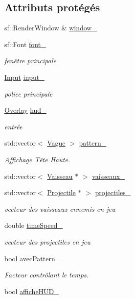 \subsection*{Attributs protégés}
\begin{DoxyCompactItemize}
\item 
sf\+::\+Render\+Window \& \hyperlink{class_partie_acb65cc46c340d6268679143aac50f8c0}{window\+\_\+}
\item 
sf\+::\+Font \hyperlink{class_partie_ab00aee0dc5c4a9eb16d17160bd6a707a}{font\+\_\+}
\begin{DoxyCompactList}\small\item\em fenêtre principale \end{DoxyCompactList}\item 
\hyperlink{_input_8h_a5588d60d674991c719a8df848313e966}{Input} \hyperlink{class_partie_a3a6f85686da661a2391dec412354c846}{input\+\_\+}
\begin{DoxyCompactList}\small\item\em police principale \end{DoxyCompactList}\item 
\hyperlink{class_overlay}{Overlay} \hyperlink{class_partie_a7d7dcc006ac52993ac65de1eae66bbf8}{hud\+\_\+}
\begin{DoxyCompactList}\small\item\em entrée \end{DoxyCompactList}\item 
std\+::vector$<$ \hyperlink{class_vague}{Vague} $>$ \hyperlink{class_partie_ab03632c60e33c4811178d9ce9c9454a9}{pattern\+\_\+}
\begin{DoxyCompactList}\small\item\em Affichage Tête Haute. \end{DoxyCompactList}\item 
std\+::vector$<$ \hyperlink{class_vaisseau}{Vaisseau} $\ast$ $>$ \hyperlink{class_partie_a39a4031c59acafbefca6fae1333ebb5a}{vaisseaux\+\_\+}
\item 
std\+::vector$<$ \hyperlink{class_projectile}{Projectile} $\ast$ $>$ \hyperlink{class_partie_a2e494ef1d28f7d1067c3a7a3282ecd29}{projectiles\+\_\+}
\begin{DoxyCompactList}\small\item\em vecteur des vaisseaux ennemis en jeu \end{DoxyCompactList}\item 
double \hyperlink{class_partie_abd0c9a82f1b42b06f4a3699a484e0766}{time\+Speed\+\_\+}
\begin{DoxyCompactList}\small\item\em vecteur des projectiles en jeu \end{DoxyCompactList}\item 
bool \hyperlink{class_partie_ac29991e8e0eb729541168f47238635a9}{avec\+Pattern\+\_\+}
\begin{DoxyCompactList}\small\item\em Facteur contrôlant le temps. \end{DoxyCompactList}\item 
bool \hyperlink{class_partie_a253b0099bf8ef4c3dce2fe3e3dd8def5}{affiche\+H\+U\+D\+\_\+}
\end{DoxyCompactItemize}


